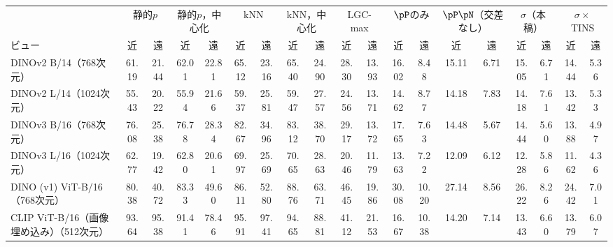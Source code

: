 {\fontsize{6.0pt}{7.1pt}\selectfont\renewcommand{\arraystretch}{1.0}%
\setlength{\tabcolsep}{1.3pt}\begin{tabular}{@{}lcc|cc|cc|cc|cc|cc|cc|cc|cc@{}}
\hline
\rule[-2.0pt]{0pt}{8.2pt} & \multicolumn{2}{c|}{静的$p$} & \multicolumn{2}{c|}{静的$p$，中心化} & \multicolumn{2}{c|}{kNN} & \multicolumn{2}{c|}{kNN，中心化} & \multicolumn{2}{c|}{LGC-max} & \multicolumn{2}{c|}{$\pP$のみ} & \multicolumn{2}{c|}{$\pP\pN$（交差なし）} & \multicolumn{2}{c|}{$\sigma$（本稿）} & \multicolumn{2}{c}{$\sigma\times$TINS} \\
\rule[-2.0pt]{0pt}{8.2pt}ビュー & 近 & 遠 & 近 & 遠 & 近 & 遠 & 近 & 遠 & 近 & 遠 & 近 & 遠 & 近 & 遠 & 近 & 遠 & 近 & 遠 \\
\hline
DINOv2 B/14（768次元） & 61.19 & 21.44 & 62.01 & 22.81 & 65.12 & 23.16 & 65.40 & 24.90 & 28.30 & 13.93 & 16.02 & 8.48 & 15.11 & 6.71 & 15.05 & 6.71 & 14.44 & 5.36 \\
DINOv2 L/14（1024次元） & 55.43 & 20.22 & 55.94 & 21.66 & 59.37 & 25.81 & 59.47 & 27.57 & 24.56 & 13.71 & 14.62 & 8.77 & 14.18 & 7.83 & 14.18 & 7.61 & 13.42 & 5.33 \\
DINOv3 B/16（768次元） & 76.08 & 25.38 & 76.78 & 28.34 & 82.67 & 34.96 & 83.12 & 38.70 & 29.17 & 13.72 & 17.65 & 7.63 & 14.48 & 5.67 & 14.44 & 5.60 & 13.88 & 4.97 \\
DINOv3 L/16（1024次元） & 62.77 & 19.42 & 62.80 & 20.61 & 69.97 & 25.69 & 70.65 & 28.63 & 20.46 & 11.79 & 13.63 & 7.22 & 12.09 & 6.12 & 12.28 & 5.86 & 11.62 & 4.36 \\
DINO (v1) ViT-B/16（768次元） & 80.38 & 40.72 & 83.33 & 49.60 & 86.11 & 52.80 & 88.76 & 63.71 & 46.45 & 19.86 & 30.08 & 10.20 & 27.14 & 8.56 & 26.22 & 8.26 & 24.42 & 7.01 \\
CLIP ViT-B/16（画像埋め込み）（512次元） & 93.64 & 95.38 & 91.41 & 78.46 & 95.91 & 97.41 & 94.65 & 88.81 & 41.12 & 21.53 & 16.67 & 10.38 & 14.20 & 7.14 & 13.43 & 6.60 & 13.79 & 6.07 \\
\hline
\end{tabular}}%
